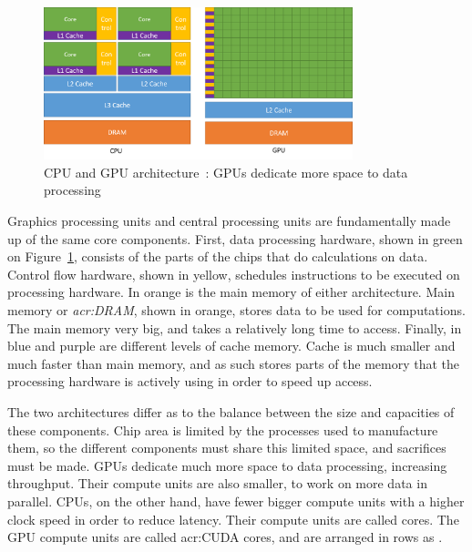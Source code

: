 \begin{figure}[H]
	\centering
	\includegraphics[width=0.8\textwidth]{Chapter_graphics_processing_units/media/gpu-devotes-more-transistors-to-data-processing}
	\caption{CPU and GPU architecture~\cite{Nvidia2021}: GPUs dedicate more space to data processing}
	\label{fig:cpu_gpu}
\end{figure}

Graphics processing units and central processing units are fundamentally made up of the same core
components. First, data processing hardware, shown in green on Figure~\ref{fig:cpu_gpu}, consists of
the parts of the chips that do calculations on data. Control flow hardware, shown in yellow,
schedules instructions to be executed on processing hardware. In orange is the main memory of either
architecture. Main memory or \textit{\acrfull{acr:DRAM}}, shown in orange, stores data to be used
for computations. The main memory very big, and takes a relatively long time to access. Finally, in
blue and purple are different levels of cache memory. Cache is much smaller and much faster than
main memory, and as such stores parts of the memory that the processing hardware is actively using
in order to speed up access.

The two architectures differ as to the balance between the size and capacities of these components.
Chip area is limited by the processes used to manufacture them, so the different components must
share this limited space, and sacrifices must be made. GPUs dedicate much more space to data
processing, increasing throughput. Their compute units are also smaller, to work on more data in
parallel. CPUs, on the other hand, have fewer bigger compute units with a higher clock speed in
order to reduce latency. Their compute units are called cores. The GPU compute units are called
\acrshort{acr:CUDA} cores, and are arranged in rows as \textit{}.

